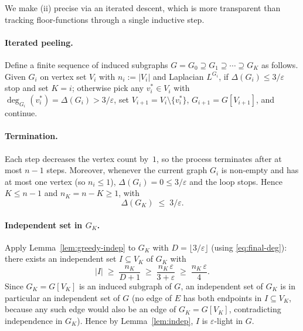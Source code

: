 \documentclass[12pt]{article}
\theoremstyle{definition}
\begin{document}
We make (ii) precise via an iterated descent, which is more transparent than tracking floor-functions through a single inductive step.

\paragraph{Iterated peeling.}
Define a finite sequence of induced subgraphs $G=G_0\supseteq G_1\supseteq\cdots\supseteq G_K$ as follows.  Given $G_i$ on vertex set $V_i$ with $n_i:=|V_i|$ and Laplacian $L^{G_i}$, if $\Delta(G_i)\le 3/\varepsilon$ stop and set $K=i$; otherwise pick any $v_i^*\in V_i$ with $\deg_{G_i}(v_i^*)=\Delta(G_i)>3/\varepsilon$, set $V_{i+1}=V_i\setminus\{v_i^*\}$, $G_{i+1}=G[V_{i+1}]$, and continue.

\paragraph{Termination.}
Each step decreases the vertex count by~$1$, so the process terminates after at most $n-1$ steps.  Moreover, whenever the current graph $G_i$ is non-empty and has at most one vertex (so $n_i\le 1$), $\Delta(G_i)=0\le 3/\varepsilon$ and the loop stops.  Hence $K\le n-1$ and $n_K=n-K\ge 1$, with
\begin{equation}\label{eq:final-deg}
\Delta(G_K) \;\le\; 3/\varepsilon.
\end{equation}

\paragraph{Independent set in $G_K$.}
Apply Lemma~\ref{lem:greedy-indep} to $G_K$ with $D=\lfloor 3/\varepsilon\rfloor$ (using \eqref{eq:final-deg}): there exists an independent set $I\subseteq V_K$ of $G_K$ with
\begin{equation}\label{eq:I-bound-1}
|I| \;\ge\; \frac{n_K}{D+1} \;\ge\; \frac{n_K\,\varepsilon}{3+\varepsilon} \;\ge\; \frac{n_K\,\varepsilon}{4}.
\end{equation}
Since $G_K=G[V_K]$ is an induced subgraph of $G$, an independent set of $G_K$ is in particular an independent set of $G$ (no edge of $E$ has both endpoints in $I\subseteq V_K$, because any such edge would also be an edge of $G_K=G[V_K]$, contradicting independence in $G_K$).  Hence by Lemma~\ref{lem:indep}, $I$ is $\varepsilon$-light in $G$.
\end{document}
